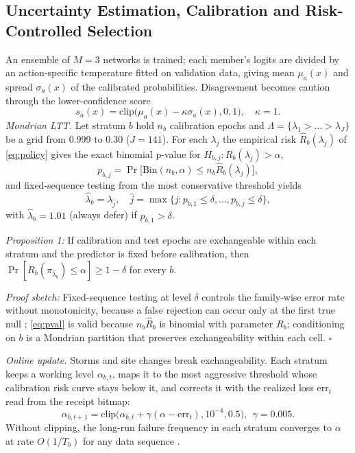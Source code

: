 \documentclass[journal]{IEEEtran}\def\WARDENieee{1}%
\begin{document}
\subsection{Uncertainty Estimation, Calibration and Risk-Controlled Selection}\label{sec:uq}
An ensemble of $M=3$ networks is trained; each member's logits are divided by an action-specific temperature fitted on validation data, giving mean $\mu_a(x)$ and spread $\sigma_a(x)$ of the calibrated probabilities. Disagreement becomes caution through the lower-confidence score
\begin{equation}
s_a(x)=\mathrm{clip}\big(\mu_a(x)-\kappa\sigma_a(x),0,1\big),\quad\kappa=1.\label{eq:score}
\end{equation}
\emph{Mondrian LTT.} Let stratum $b$ hold $n_b$ calibration epochs and $\Lambda=\{\lambda_1>\dots>\lambda_J\}$ be a grid from 0.999 to 0.30 ($J=141$). For each $\lambda_j$ the empirical risk $\hat R_b(\lambda_j)$ of \eqref{eq:policy} gives the exact binomial p-value for $H_{b,j}\!:R_b(\lambda_j)>\alpha$,
\begin{equation}
p_{b,j}=\Pr\big[\mathrm{Bin}(n_b,\alpha)\le n_b\hat R_b(\lambda_j)\big],\label{eq:pval}
\end{equation}
and fixed-sequence testing from the most conservative threshold yields
\begin{equation}
\hat\lambda_b=\lambda_{\hat j},\quad \hat j=\max\{j: p_{b,1}\le\delta,\dots,p_{b,j}\le\delta\},\label{eq:lambda}
\end{equation}
with $\hat\lambda_b=1.01$ (always defer) if $p_{b,1}>\delta$.

\emph{Proposition 1:} If calibration and test epochs are exchangeable within each stratum and the predictor is fixed before calibration, then $\Pr[R_b(\pi_{\hat\lambda_b})\le\alpha]\ge1-\delta$ for every $b$.

\emph{Proof sketch:} Fixed-sequence testing at level $\delta$ controls the family-wise error rate without monotonicity, because a false rejection can occur only at the first true null \cite{b34}; \eqref{eq:pval} is valid because $n_b\hat R_b$ is binomial with parameter $R_b$; conditioning on $b$ is a Mondrian partition that preserves exchangeability within each cell. \hfill$\square$

\emph{Online update.} Storms and site changes break exchangeability. Each stratum keeps a working level $\alpha_{b,t}$, maps it to the most aggressive threshold whose calibration risk curve stays below it, and corrects it with the realized loss $\mathrm{err}_t$ read from the receipt bitmap:
\begin{equation}
\alpha_{b,t+1}=\mathrm{clip}\big(\alpha_{b,t}+\gamma(\alpha-\mathrm{err}_t),10^{-4},0.5\big),\ \ \gamma=0.005 .\label{eq:aci}
\end{equation}
Without clipping, the long-run failure frequency in each stratum converges to $\alpha$ at rate $O(1/T_b)$ for any data sequence \cite{b35}.
\end{document}
